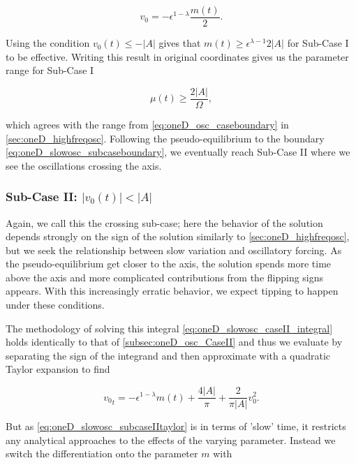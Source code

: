 \begin{equation*}
v_0=-\epsilon^{1-\lambda}\frac{m(t)}{2}.
\end{equation*}

Using the condition $v_0(t)\le -|A|$ gives that $m(t)\ge \epsilon^{\lambda-1}2|A|$ for Sub-Case I to be effective. Writing this result in original coordinates gives us the parameter range for Sub-Case I

\begin{equation}\label{eq:oneD_slowosc_subcaseboundary}
\mu(t)\ge \frac{2 |A|}{\Omega},
\end{equation}

which agrees with the range from \eqref{eq:oneD_osc_caseboundary} in \autoref{sec:oneD_highfreqosc}. Following the pseudo-equilibrium to the boundary \eqref{eq:oneD_slowosc_subcaseboundary}, we eventually reach Sub-Case II where we see the oscillations crossing the axis.

\subsubsection{Sub-Case II: $|v_0(t)|< |A|$}
\label{subsubsec:oneD_slowosc_subcaseII}

Again, we call this the crossing sub-case; here the behavior of the solution depends strongly on the sign of the solution similarly to \autoref{sec:oneD_highfreqosc}, but we seek the relationship between slow variation and oscillatory forcing. As the pseudo-equilibrium get closer to the axis, the solution spends more time above the axis and more complicated contributions from the flipping signs appears. With this increasingly erratic behavior, we expect tipping to happen under these conditions.

The methodology of solving this integral \eqref{eq:oneD_slowosc_caseII_integral} holds identically to that of \autoref{subsec:oneD_osc_CaseII} and thus we evaluate by separating the sign of the integrand and then approximate with a quadratic Taylor expansion to find

\begin{equation}\label{eq:oneD_slowosc_subcaseIItaylor}
{v_0}_t = -\epsilon^{1-\lambda}m(t) + \frac{4|A|}{\pi} + \frac{2}{\pi |A|}v_0^2.
\end{equation}

But as \eqref{eq:oneD_slowosc_subcaseIItaylor} is in terms of 'slow' time, it restricts any analytical approaches to the effects of the varying parameter. Instead we switch the differentiation onto the parameter $m$ with

